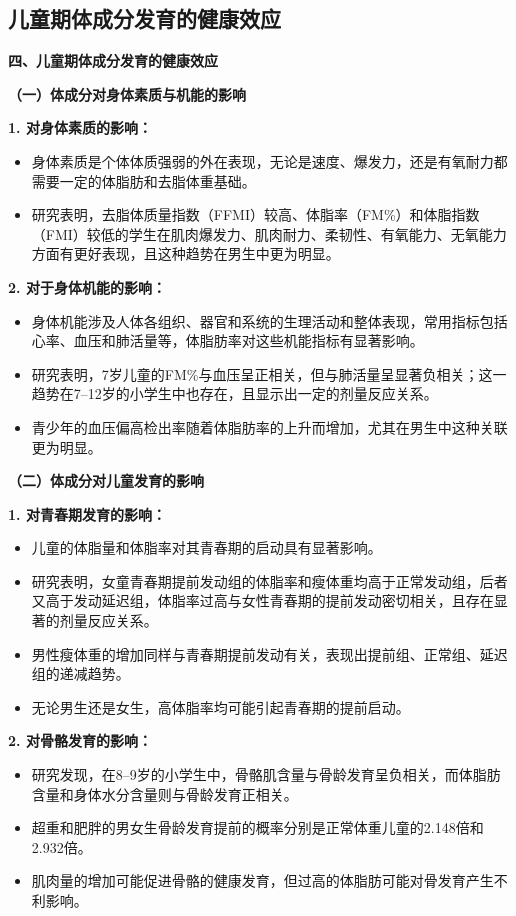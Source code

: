 \subsection{儿童期体成分发育的健康效应}

\begin{keybox}
\textbf{四、儿童期体成分发育的健康效应}

\textbf{（一）体成分对身体素质与机能的影响}

\textbf{1. 对身体素质的影响：}
\begin{itemize}[leftmargin=*]
    \item 身体素质是个体体质强弱的外在表现，无论是速度、爆发力，还是有氧耐力都需要一定的体脂肪和去脂体重基础。
    \item 研究表明，去脂体质量指数（FFMI）较高、体脂率（FM\%）和体脂指数（FMI）较低的学生在肌肉爆发力、肌肉耐力、柔韧性、有氧能力、无氧能力方面有更好表现，且这种趋势在男生中更为明显。
\end{itemize}

\textbf{2. 对于身体机能的影响：}
\begin{itemize}[leftmargin=*]
    \item 身体机能涉及人体各组织、器官和系统的生理活动和整体表现，常用指标包括心率、血压和肺活量等，体脂肪率对这些机能指标有显著影响。
    \item 研究表明，7岁儿童的FM\%与血压呈正相关，但与肺活量呈显著负相关；这一趋势在7--12岁的小学生中也存在，且显示出一定的剂量反应关系。
    \item 青少年的血压偏高检出率随着体脂肪率的上升而增加，尤其在男生中这种关联更为明显。
\end{itemize}

\textbf{（二）体成分对儿童发育的影响}

\textbf{1. 对青春期发育的影响：}
\begin{itemize}[leftmargin=*]
    \item 儿童的体脂量和体脂率对其青春期的启动具有显著影响。
    \item 研究表明，女童青春期提前发动组的体脂率和瘦体重均高于正常发动组，后者又高于发动延迟组，体脂率过高与女性青春期的提前发动密切相关，且存在显著的剂量反应关系。
    \item 男性瘦体重的增加同样与青春期提前发动有关，表现出提前组、正常组、延迟组的递减趋势。
    \item 无论男生还是女生，高体脂率均可能引起青春期的提前启动。
\end{itemize}

\textbf{2. 对骨骼发育的影响：}
\begin{itemize}[leftmargin=*]
    \item 研究发现，在8--9岁的小学生中，骨骼肌含量与骨龄发育呈负相关，而体脂肪含量和身体水分含量则与骨龄发育正相关。
    \item 超重和肥胖的男女生骨龄发育提前的概率分别是正常体重儿童的2.148倍和2.932倍。
    \item 肌肉量的增加可能促进骨骼的健康发育，但过高的体脂肪可能对骨发育产生不利影响。
\end{itemize}


\end{keybox}

